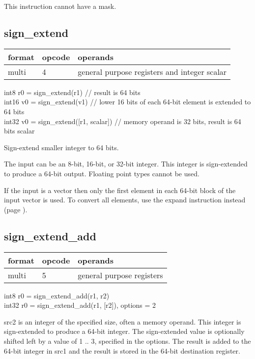 \documentclass[forwardcom.tex]{subfiles}
\begin{document}
This instruction cannot have a mask.
\vv

\subsection{sign\_extend}
\label{table:signExtendInstruction}
\begin{tabular}{|p{12mm}|p{15mm}|p{100mm}|}
\hline
\bfseries format & \bfseries opcode & \bfseries operands \\ \hline
multi & 4 & general purpose registers and integer scalar \\ \hline
\end{tabular}
\vv

int8 r0 = sign\_extend(r1)  // result is 64 bits\\
int16 v0 = sign\_extend(v1)  // lower 16 bits of each 64-bit element is extended to 64 bits\\
int32 v0 = sign\_extend([r1, scalar]) // memory operand is 32 bits, result is 64 bits scalar
\vv

Sign-extend smaller integer to 64 bits.
\vv

The input can be an 8-bit, 16-bit, or 32-bit integer. This integer is sign-extended to produce a 64-bit output. Floating point types cannot be used.
\vv

If the input is a vector then only the first element in each 64-bit block of the input vector is used. To convert all elements, use the expand instruction instead 
(page \pageref{table:expandInstruction}).
\vv


\subsection{sign\_extend\_add}
\label{table:signExtendAddInstruction}
\begin{tabular}{|p{12mm}|p{15mm}|p{100mm}|}
\hline
\bfseries format & \bfseries opcode & \bfseries operands \\ \hline
multi & 5 & general purpose registers \\ \hline
\end{tabular}
\vv

int8 r0 = sign\_extend\_add(r1, r2) \\ 
int32 r0 = sign\_extend\_add(r1, [r2]), options = 2
\vv

src2 is an integer of the specified size, often a memory operand.
This integer is sign-extended to produce a 64-bit integer. 
The sign-extended value is optionally shifted left by a value of 1 .. 3, specified in the options. 
The result is added to the 64-bit integer in src1 and the result is stored in the 64-bit destination register.
\vv
\end{document}
